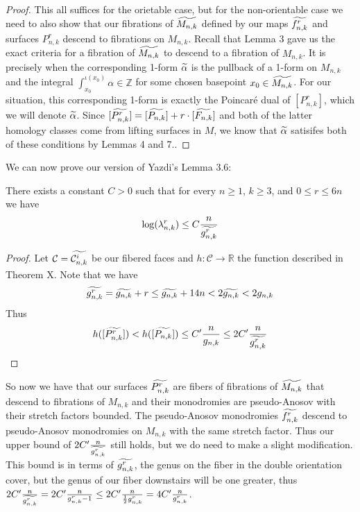 \begin{proof}
    This all suffices for the orietable case, but for the non-orientable case we need to also show that our fibrations of $\widetilde{M_{n,k}}$ defined by our maps $\widetilde{f^r_{n,k}}$ and surfaces $P^r_{n,k}$ descend to fibrations on $M_{n,k}$. Recall that Lemma 3 gave us the exact criteria for a fibration of $\widetilde{M_{n,k}}$ to descend to a fibration of $M_{n,k}$. It is precisely when the corresponding 1-form $\widetilde{\alpha}$ is the pullback of a 1-form on $M_{n,k}$ and the integral $\int_{x_0}^{\iota(x_0)} \alpha \in \mathbb{Z}$ for some chosen basepoint $x_0 \in \widetilde{M_{n,k}}$. For our situation, this corresponding 1-form is exactly the Poincar\'e dual of $[P^r_{n,k}]$, which we will denote $\widetilde{\alpha}$. Since $[\widetilde{P^r_{n,k}}] = [\widetilde{P_{n,k}}] + r\cdot[\widetilde{F_{n,k}}]$ and both of the latter homology classes come from lifting surfaces in $M$, we know that $\widetilde{\alpha}$ satisifes both of these conditions by Lemmas 4 and 7..
\end{proof}

We can now prove our version of Yazdi's Lemma 3.6:

\begin{lem}
There exists a constant $C > 0$ such that for every $n \geq 1$, $k \geq 3$, and $0 \leq r \leq 6n$ we have $$\log(\lambda^r_{n,k}) \leq C\frac{n}{\widetilde{g^r_{n,k}}}$$
\end{lem}
\begin{proof}
    Let $\mathcal{C} = \widetilde{\mathcal{C}^i_{n,k}}$ be our fibered faces and $h: \mathcal{C} \xrightarrow[]{} \mathbb{R}$ the function described in Theorem X. Note that we have
    $$\widetilde{g^r_{n,k}} = \widetilde{g_{n,k}} + r \leq \widetilde{g_{n,k}} + 14n < 2\widetilde{g_{n,k}} < 2g_{n,k}$$
    Thus
    $$h([\widetilde{P^r_{n,k}}]) < h([\widetilde{P_{n,k}}]) \leq C'\frac{n}{g_{n,k}} \leq 2C'\frac{n}{\widetilde{g^r_{n,k}}} $$
\end{proof}

So now we have that our surfaces $\widetilde{P^r_{n,k}}$ are fibers of fibrations of $\widetilde{M_{n,k}}$ that descend to fibrations of $M_{n,k}$ and their monodromies are pseudo-Anosov with their stretch factors bounded. The pseudo-Anosov monodromies $\widetilde{f^r_{n,k}}$ descend to pseudo-Anosov monodromies on $M_{n,k}$ with the same stretch factor. Thus our upper bound of $2C'\frac{n}{\widetilde{g^{r}_{n,k}}}$ still holds, but we do need to make a slight modification. This bound is in terms of $\widetilde{g^r_{n,k}}$, the genus on the fiber in the double orientation cover, but the genus of our fiber downstairs will be one greater, thus $2C'\frac{n}{\widetilde{g^r_{n,k}}} = 2C'\frac{n}{g^r_{n,k} - 1} \leq 2C'\frac{n}{\frac{1}{2}g^r_{n,k}} = 4C'\frac{n}{g^r_{n,k}}$.

